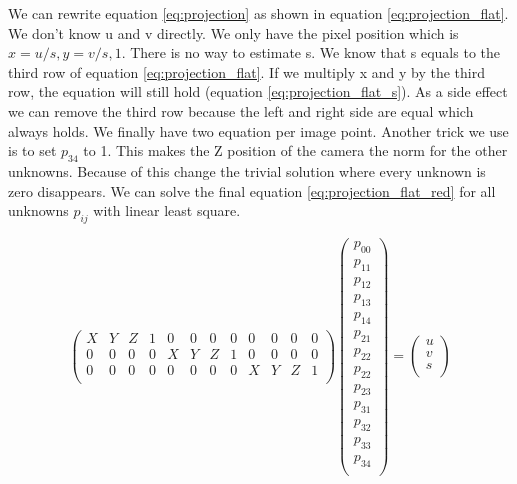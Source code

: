 \documentclass[11pt,a4paper,titlepage,oneside]{report}
\begin{document}
We can rewrite equation \ref{eq:projection} as shown in equation \ref{eq:projection_flat}. We don't know u and v directly. We only have the pixel position which is $x=u/s, y=v/s, 1$. There is no way to estimate s. We know that s equals to the third row of equation \ref{eq:projection_flat}. If we multiply x and y by the third row, the equation will still hold (equation \ref{eq:projection_flat_s}). As a side effect we can remove the third row because the left and right side are equal which always holds. We finally have two equation per image point. Another trick we use is to set $p_{34}$ to 1. This makes the Z position of the camera the norm for the other unknowns. Because of this change the trivial solution where every unknown is zero disappears. We can solve the final equation \ref{eq:projection_flat_red} for all unknowns $p_{ij}$ with linear least square.

\setcounter{MaxMatrixCols}{15}
\begin{equation}\label{eq:projection_flat}
	\begin{pmatrix}
		X & Y & Z & 1 & 0 & 0 & 0 & 0 & 0 & 0 & 0 & 0\\
		0 & 0 & 0 & 0 & X & Y & Z & 1 & 0 & 0 & 0 & 0\\
		0 & 0 & 0 & 0 & 0 & 0 & 0 & 0 & X & Y & Z & 1\\
	\end{pmatrix}
	\begin{pmatrix}p_{00}\\
		p_{11}\\
		p_{12}\\
		p_{13}\\
		p_{14}\\
		p_{21}\\
		p_{22}\\
		p_{22}\\
		p_{23}\\
		p_{31}\\
		p_{32}\\
		p_{33}\\
		p_{34} \\
	\end{pmatrix}=
	\begin{pmatrix}u\\
		v\\
		s\\
	\end{pmatrix}
\end{equation}
\end{document}
